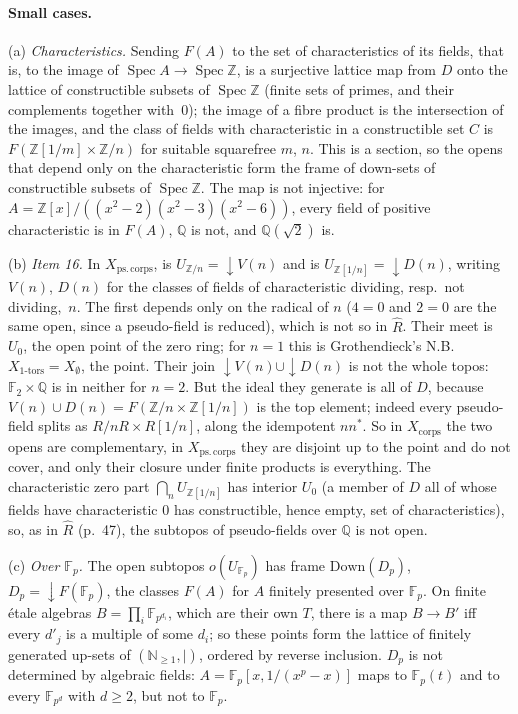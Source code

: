 \paragraph{Small cases.} (a) \emph{Characteristics.} Sending $F(A)$ to the set of characteristics of its fields, that is, to the image of $\operatorname{Spec}A\to\operatorname{Spec}\mathbb Z$, is a surjective lattice map from $D$ onto the lattice of constructible subsets of $\operatorname{Spec}\mathbb Z$ (finite sets of primes, and their complements together with~$0$); the image of a fibre product is the intersection of the images, and the class of fields with characteristic in a constructible set $C$ is $F(\mathbb Z[1/m]\times\mathbb Z/n)$ for suitable squarefree $m$, $n$. This is a section, so the opens that depend only on the characteristic form the frame of down-sets of constructible subsets of $\operatorname{Spec}\mathbb Z$. The map is not injective: for $A = \mathbb Z[x]/((x^2-2)(x^2-3)(x^2-6))$, every field of positive characteristic is in $F(A)$, $\mathbb Q$ is not, and $\mathbb Q(\sqrt2)$ is.

(b) \emph{Item 16.} In $X_{\mathrm{ps.\,corps}}$,  is $U_{\mathbb Z/n} = {\downarrow}V(n)$ and  is $U_{\mathbb Z[1/n]} = {\downarrow}D(n)$, writing $V(n)$, $D(n)$ for the classes of fields of characteristic dividing, resp.\ not dividing,~$n$. The first depends only on the radical of $n$ ($4 = 0$ and $2 = 0$ are the same open, since a pseudo-field is reduced), which is not so in $\widehat R$. Their meet is $U_0$, the open point of the zero ring; for $n = 1$ this is Grothendieck's N.B.\ $X_{1\text{-tors}} = X_\emptyset$, the point. Their join ${\downarrow}V(n)\cup{\downarrow}D(n)$ is not the whole topos: $\mathbb F_2\times\mathbb Q$ is in neither for $n = 2$. But the ideal they generate is all of $D$, because $V(n)\cup D(n) = F(\mathbb Z/n\times\mathbb Z[1/n])$ is the top element; indeed every pseudo-field splits as $R/nR\times R[1/n]$, along the idempotent $nn^*$. So in $X_{\mathrm{corps}}$ the two opens are complementary, in $X_{\mathrm{ps.\,corps}}$ they are disjoint up to the point and do not cover, and only their closure under finite products is everything. The characteristic zero part $\bigcap_nU_{\mathbb Z[1/n]}$ has interior $U_0$ (a member of $D$ all of whose fields have characteristic $0$ has constructible, hence empty, set of characteristics), so, as in $\widehat R$ (p.~47), the subtopos of pseudo-fields over $\mathbb Q$ is not open.

(c) \emph{Over $\mathbb F_p$.} The open subtopos $o(U_{\mathbb F_p})$ has frame $\mathrm{Down}(D_p)$, $D_p = {\downarrow}F(\mathbb F_p)$, the classes $F(A)$ for $A$ finitely presented over $\mathbb F_p$. On finite étale algebras $B = \prod_i\mathbb F_{p^{d_i}}$, which are their own $T$, there is a map $B\to B'$ iff every $d'_j$ is a multiple of some $d_i$; so these points form the lattice of finitely generated up-sets of $(\mathbb N_{\ge1},\mid)$, ordered by reverse inclusion. $D_p$ is not determined by algebraic fields: $A = \mathbb F_p[x,1/(x^p-x)]$ maps to $\mathbb F_p(t)$ and to every $\mathbb F_{p^d}$ with $d\ge2$, but not to $\mathbb F_p$.

